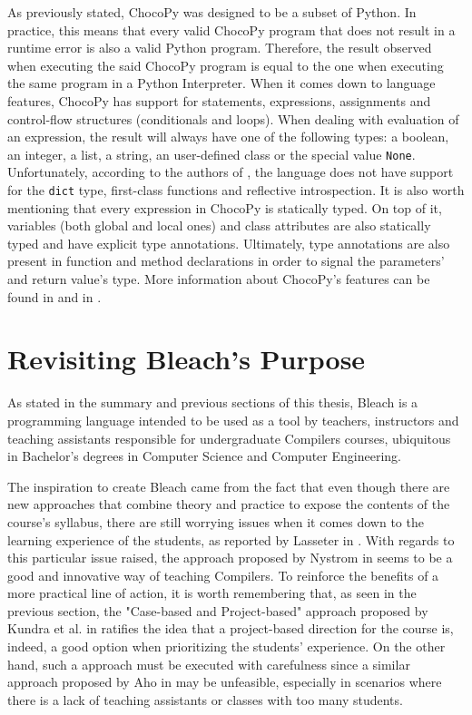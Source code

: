 \begin{itemize}
    As previously stated, ChocoPy was designed to be a subset of Python. In practice, this means that every valid ChocoPy program that does not result in a runtime error is also a valid Python program. Therefore, the result observed when executing the said ChocoPy program is equal to the one when executing the same program in a Python Interpreter. When it comes down to language features, ChocoPy has support for statements, expressions, assignments and control-flow structures (conditionals and loops). When dealing with evaluation of an expression, the result will always have one of the following types: a boolean, an integer, a list, a string, an user-defined class or the special value \texttt{None}. Unfortunately, according to the authors of \cite{padhye2019chocopy}, the language does not have support for the \texttt{dict} type, first-class functions and reflective introspection. It is also worth mentioning that every expression in ChocoPy is statically typed. On top of it, variables (both global and local ones) and class attributes are also statically typed and have explicit type annotations. Ultimately, type annotations are also present in function and method declarations in order to signal the parameters' and return value's type. More information about ChocoPy's features can be found in \cite{padhye2019chocopy} and in \cite{chocopy_v2.2_language_manual_reference}.
    
\end{itemize}

\section{Revisiting Bleach's Purpose}
As stated in the summary and previous sections of this thesis, Bleach is a programming language intended to be used as a tool by teachers, instructors and teaching assistants responsible for undergraduate Compilers courses, ubiquitous in Bachelor's degrees in Computer Science and Computer Engineering.

The inspiration to create Bleach came from the fact that even though there are new approaches that combine theory and practice to expose the contents of the course's syllabus, there are still worrying issues when it comes down to the learning experience of the students, as reported by Lasseter in \cite{lasseter2015interpreter}. With regards to this particular issue raised, the approach proposed by Nystrom in \cite{nystrom2021crafting} seems to be a good and innovative way of teaching Compilers. To reinforce the benefits of a more practical line of action, it is worth remembering that, as seen in the previous section, the "Case-based and Project-based" approach proposed by Kundra et al. in \cite{kundra2016experience} ratifies the idea that a project-based direction for the course is, indeed, a good option when prioritizing the students' experience. On the other hand, such a approach must be executed with carefulness since a similar approach proposed by Aho in \cite{aho2008teaching} may be unfeasible, especially in scenarios where there is a lack of teaching assistants or classes with too many students.

